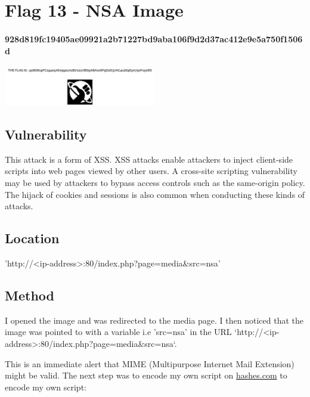 \section{Flag 13 - NSA Image}

\paragraph{928d819fc19405ae09921a2b71227bd9aba106f9d2d37ac412e9e5a750f1506d}
\begin{center}
    \includegraphics[width=0.5\textwidth]{16.Flag13/02-07.png}\\[0cm] 
\end{center}

\subsection{Vulnerability}

This attack is a form of XSS. XSS attacks enable attackers to inject client-side scripts into web pages viewed by other users. A cross-site scripting vulnerability may be used by attackers to bypass access controls such as the same-origin policy. The hijack of cookies and sessions is also common when conducting these kinds of attacks.

\subsection{Location}

'http://<ip-address>:80/index.php?page=media\&src=nsa'

\subsection{Method}

I opened the image and was redirected to the media page. I then noticed that the image was pointed to with a variable i.e 'src=nsa' in the URL `http://<ip-address>:80/index.php?page=media\&src=nsa`.

This is an immediate alert that MIME (Multipurpose Internet Mail Extension) might be valid.
The next step was to encode my own script on \href{https://hashes.com/en/tools/base64encode}{hashes.com} to encode my own script:

